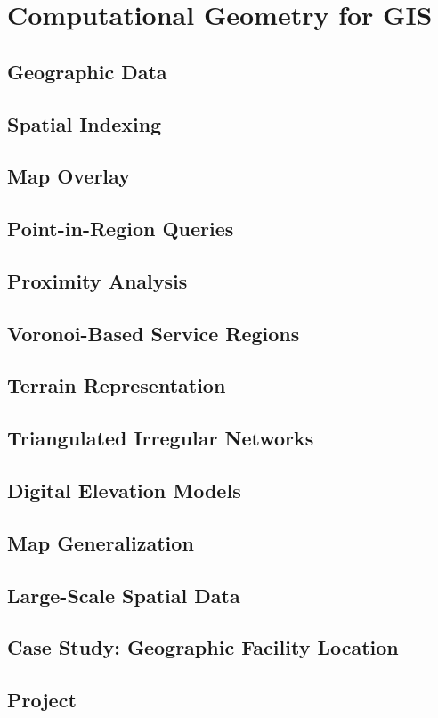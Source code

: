 \chapter{Computational Geometry for GIS}
\label{ch:applications_gis}


\section{Geographic Data}
\label{sec:gis_data}

\section{Spatial Indexing}
\label{sec:gis_indexing}

\section{Map Overlay}
\label{sec:gis_overlay}

\section{Point-in-Region Queries}
\label{sec:gis_point_in_region}

\section{Proximity Analysis}
\label{sec:gis_proximity}

\section{Voronoi-Based Service Regions}
\label{sec:gis_voronoi}

\section{Terrain Representation}
\label{sec:gis_terrain}

\section{Triangulated Irregular Networks}
\label{sec:gis_tin}

\section{Digital Elevation Models}
\label{sec:gis_dem}

\section{Map Generalization}
\label{sec:gis_generalization}

\section{Large-Scale Spatial Data}
\label{sec:gis_large_scale}

\section{Case Study: Geographic Facility Location}
\label{sec:gis_case_study}

\section{Project}
\label{sec:gis_project}
